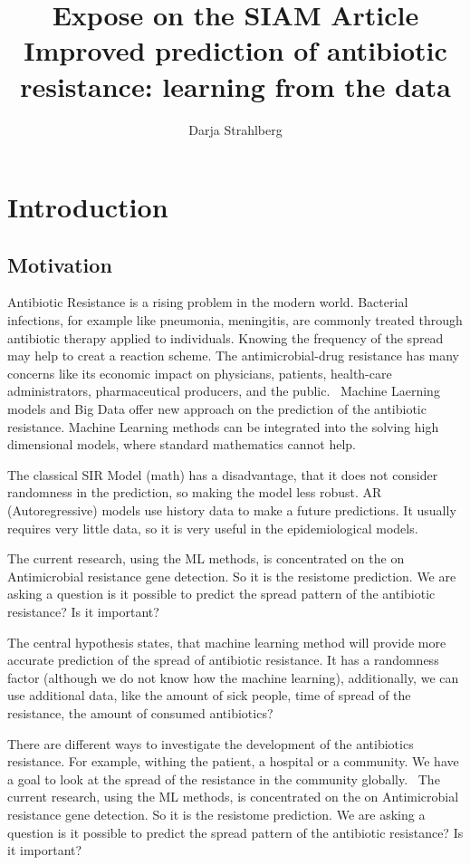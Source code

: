 \documentclass[12pt]{article}
\title{Expose on the SIAM Article 
	Improved prediction of antibiotic resistance: learning from the data}
\author{Darja Strahlberg}
\begin{document}
\maketitle

\section{Introduction}
\subsection{Motivation}
Antibiotic Resistance is a rising problem in the modern world. Bacterial infections, for example like pneumonia, meningitis,  are commonly treated through antibiotic therapy applied to individuals. Knowing the frequency of the spread may help to creat a reaction scheme. The antimicrobial-drug resistance has many concerns like its economic impact on physicians, patients, health-care administrators, pharmaceutical producers, and the public.~\cite{JohnE.McGowan.2001}
Machine Laerning models and Big Data offer new approach on the prediction of the antibiotic resistance. Machine Learning methods can be integrated into the solving high dimensional models, where standard mathematics cannot help. 

The classical SIR Model (math) has a disadvantage, that it does not consider randomness in the prediction, so making the model less robust. AR (Autoregressive) models use history data to make a future predictions. It usually requires very little data, so it is very useful in the epidemiological models.

The current research, using the ML methods, is concentrated on the on Antimicrobial resistance gene detection. So it is the resistome prediction. We are asking a question is it possible to predict the spread pattern of the antibiotic resistance? Is it important?

The central hypothesis states, that machine learning method will provide more accurate prediction of the spread of antibiotic resistance. It has a randomness factor (although we do not know how the machine learning), additionally, we can use additional data, like the amount of sick people, time of spread of the resistance, the amount of consumed antibiotics?

There are different ways to investigate the development of the antibiotics resistance. For example, withing the patient, a hospital or a community. We have a goal to look at the spread of the resistance in the community globally.~\cite{Austin.} The current research, using the ML methods, is concentrated on the on Antimicrobial resistance gene detection. So it is the resistome prediction. We are asking a question is it possible to predict the spread pattern of the antibiotic resistance? Is it important?
\end{document}
